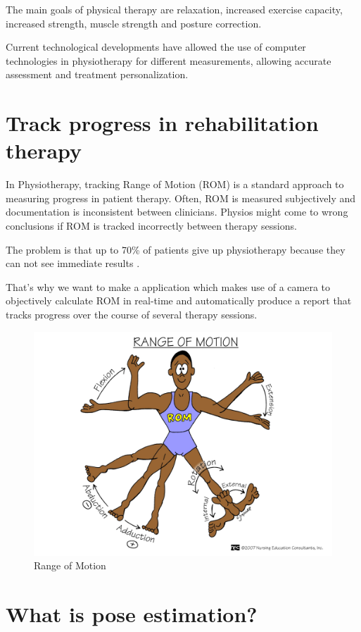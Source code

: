 
The main goals of physical therapy are relaxation, increased exercise capacity, 
increased strength, muscle strength and posture correction.

Current technological developments have allowed the use of computer technologies in physiotherapy
 for different measurements, allowing accurate assessment and treatment personalization.
\section{Track progress in rehabilitation therapy}


\par In Physiotherapy, tracking Range of Motion (ROM) is a standard approach to measuring progress in patient therapy. 
Often, ROM is measured subjectively and documentation is inconsistent between clinicians. 
Physios might come to wrong conclusions if ROM is tracked incorrectly between therapy sessions.


\par The problem is that up to 70\% of patients give up physiotherapy because they can not see 
immediate results \cite{7FactsInPhysicalTherapy}.
\par That's why we want to make a application which makes use of a camera to objectively 
calculate ROM in real-time and automatically produce a report that tracks progress over the course 
of several therapy sessions.

\begin{figure}[htbp]
	\centerline{\includegraphics[scale=0.25]{fig/rangeofmotion.png}}  
	\caption{Range of Motion}
\end{figure}

\section{What is pose estimation?}